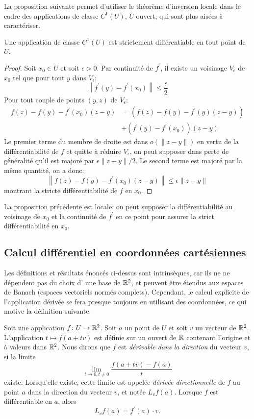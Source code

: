 La proposition suivante permet d'utiliser le théorème d'inversion locale dans le cadre des applications de classe $C^1(U)$,
 $U$ ouvert, qui sont plus aisées à caractériser.
\begin{fprop}
Une application de classe $C^1(U)$ est strictement différentiable en tout point de $U$.
\end{fprop}
\begin{proof}
Soit $x_0\in U$ et soit $\epsilon > 0$. Par continuité de $f^\prime$, il existe un voisinage $V_\epsilon$ de 
$x_0$ tel que pour tout $y$ dans $V_\epsilon$:
\[
\left\| f^{\prime}(y)-f^\prime(x_0) \right\| \leq \frac{\epsilon}{2} 
\]
Pour tout couple de points $(y,z)$ de $V_\epsilon$:
\begin{align*}
f(z)-f(y)-f^\prime(x_0)(z-y) & = \left(f(z)-f(y)-f^\prime(y)(z-y) \right)  \\
& + \left(f^\prime(y)-f^\prime(x_0)\right)(z-y)
\end{align*}
Le premier terme du membre de droite est dans $o(\|z-y\|)$ en vertu de la différentiabilité de $f$ et quitte à réduire $V_\epsilon$, 
on peut supposer dans perte de généralité qu'il est majoré par $\epsilon \|z-y\| /2$. 
Le second terme est majoré par la même quantité, on a donc:
\[
\left\|f(z)-f(y)-f^\prime(x_0)(z-y)\right \| \leq  \epsilon \|z-y\|
\]
montrant la stricte différentiabilité de $f$ en $x_0$.
\end{proof}
La proposition précédente est locale: on peut supposer la différentiabilité au voisinage de $x_0$ et la 
continuité de $f^\prime$ en ce point pour assurer la strict différentiabilité en $x_0$.



\subsection{Calcul différentiel en coordonnées cartésiennes}

Les définitions et résultats énoncés ci-dessus sont intrinsèques, car ils ne ne dépendent pas du choix 
d' une base de $\mathbb R^2$, et peuvent être étendus aux espaces de Banach (espaces vectoriels normés complets).
Cependant, le calcul explicite de l'application dérivée se fera presque toujours en utilisant des coordonnées, ce qui motive
la définition suivante. 

\begin{defn}
Soit une application $f \colon U \to \mathbb R^2$. Soit $a$ un point de $U$ et soit $v$ un vecteur de $\mathbb R^2$. L'application $t \mapsto f(a+t v)$ est définie sur un ouvert de $\mathbb R$ contenant l'origine et à valeurs dans $\mathbb R^2$. Nous dirons que $f$ est \textit{dérivable dans la direction} du vecteur $v$, si la limite 
\[\lim_{t \rightarrow 0, t \neq 0} \frac{f(a+tv)-f(a)}{t}\]
existe. Lorsqu'elle existe, cette limite est appelée \textit{dérivée directionnelle} de $f$ au point $a$ dans la direction du vecteur $v$, et notée $L_v f(a)$. Lorsque $f$ est différentiable en $a$, alors
\[L_v f(a)=f^\prime(a) \cdot v.\]
\end{defn}


